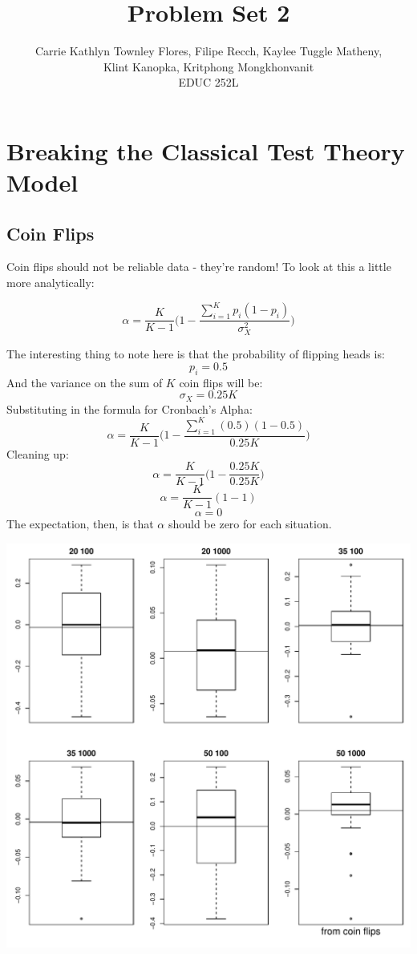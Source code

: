 \documentclass{article}\usepackage[]{graphicx}\usepackage[]{color}
\title{Problem Set 2}
\author{Carrie Kathlyn Townley Flores, Filipe Recch, Kaylee Tuggle Matheny, \\ Klint Kanopka, Kritphong Mongkhonvanit \\ EDUC 252L}
\makeatletter
\def\maxwidth{ %
  \ifdim\Gin@nat@width>\linewidth
    \linewidth
  \else
    \Gin@nat@width
  \fi
}
\newenvironment{knitrout}{}{} %
\makeatother
\begin{document}
\maketitle
\section{Breaking the Classical Test Theory Model}

  \subsection{Coin Flips}
    Coin flips should not be reliable data - they're random!  To look at this a little more analytically:
    
      \[ \alpha = \frac{K}{K-1}\Bigg(1-\frac{\sum_{i=1}^{K}p_i(1-p_i)}{\sigma_{X}^{2}}\Bigg)\]
    
    The interesting thing to note here is that the probability of flipping heads is:
      \[p_i = 0.5 \]
    And the variance on the sum of $K$ coin flips will be:
      \[ \sigma_X = 0.25K \]
    Substituting in the formula for Cronbach's Alpha:
      \[ \alpha = \frac{K}{K-1}\Bigg(1-\frac{\sum_{i=1}^{K}(0.5)(1-0.5)}{0.25K}\Bigg)\]
    Cleaning up:
      \[ \alpha = \frac{K}{K-1}\Bigg(1-\frac{0.25K}{0.25K}\Bigg)\]
      \[ \alpha = \frac{K}{K-1}(1-1)\]
      \[ \alpha = 0 \]
    The expectation, then, is that $\alpha$ should be zero for each situation.


\begin{knitrout}
\color{fgcolor}
\includegraphics[width=\maxwidth]{figure/unnamed-chunk-2-1} 

\end{knitrout}
\end{document}
